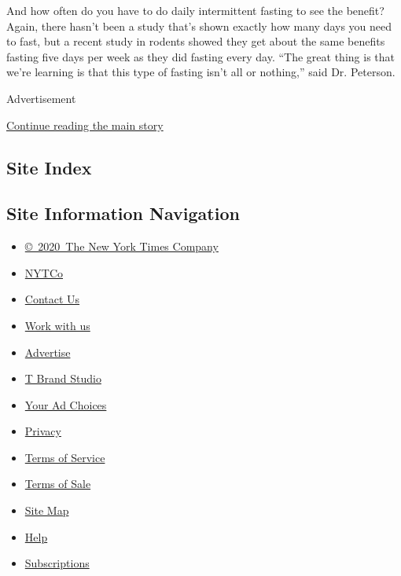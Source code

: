 And how often do you have to do daily intermittent fasting to see the
benefit? Again, there hasn't been a study that's shown exactly how many
days you need to fast, but a recent study in rodents showed they get
about the same benefits fasting five days per week as they did fasting
every day. ``The great thing is that we're learning is that this type of
fasting isn't all or nothing,'' said Dr. Peterson.

Advertisement

\protect\hyperlink{after-bottom}{Continue reading the main story}

\hypertarget{site-index}{%
\subsection{Site Index}\label{site-index}}

\hypertarget{site-information-navigation}{%
\subsection{Site Information
Navigation}\label{site-information-navigation}}

\begin{itemize}
\tightlist
\item
  \href{https://help.nytimes.com/hc/en-us/articles/115014792127-Copyright-notice}{©~2020~The
  New York Times Company}
\end{itemize}

\begin{itemize}
\tightlist
\item
  \href{https://www.nytco.com/}{NYTCo}
\item
  \href{https://help.nytimes.com/hc/en-us/articles/115015385887-Contact-Us}{Contact
  Us}
\item
  \href{https://www.nytco.com/careers/}{Work with us}
\item
  \href{https://nytmediakit.com/}{Advertise}
\item
  \href{http://www.tbrandstudio.com/}{T Brand Studio}
\item
  \href{https://www.nytimes.com/privacy/cookie-policy\#how-do-i-manage-trackers}{Your
  Ad Choices}
\item
  \href{https://www.nytimes.com/privacy}{Privacy}
\item
  \href{https://help.nytimes.com/hc/en-us/articles/115014893428-Terms-of-service}{Terms
  of Service}
\item
  \href{https://help.nytimes.com/hc/en-us/articles/115014893968-Terms-of-sale}{Terms
  of Sale}
\item
  \href{https://spiderbites.nytimes.com}{Site Map}
\item
  \href{https://help.nytimes.com/hc/en-us}{Help}
\item
  \href{https://www.nytimes.com/subscription?campaignId=37WXW}{Subscriptions}
\end{itemize}
